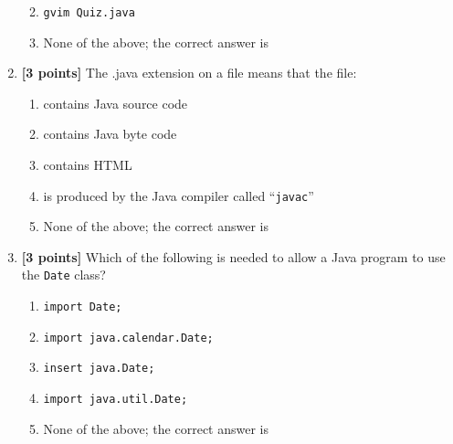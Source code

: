 \begin{enumerate}
\begin{enumerate}
\medskip 
\item \verb$gvim Quiz.java$

\medskip
\item None of the above; the correct answer is \underline{\hspace{3in}}
\end{enumerate}


\bigskip
\bigskip


\item {\bf [3 points]}
  The .java extension on a file means that the file:
  \begin{enumerate}
    \item contains Java source code
      \medskip 
    \item contains Java byte code
      \medskip
    \item contains HTML
      \medskip 
    \item is produced by the Java compiler called ``{\tt javac}''
      \medskip
    \item None of the above; the correct answer is \underline{\hspace{3in}}
  \end{enumerate}

\bigskip
\bigskip

\item {\bf [3 points]}
  Which of the following is needed to allow a Java program to use the {\tt Date} class?
  \begin{enumerate}
    \item {\tt import Date;}
      \medskip 
    \item {\tt import java.calendar.Date;}
      \medskip 
    \item {\tt insert java.Date;}
      \medskip
    \item {\tt import java.util.Date;}
      \medskip
    \item None of the above; the correct answer is \underline{\hspace{3in}}
  \end{enumerate}

\bigskip
\bigskip



\end{enumerate}
